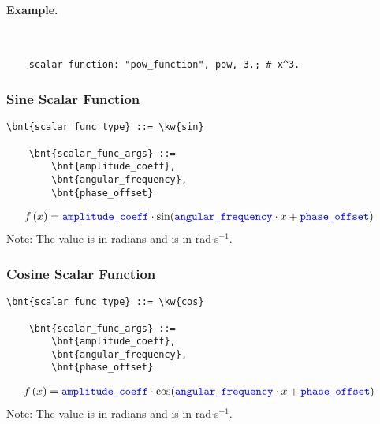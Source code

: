 \paragraph{Example.} \
\begin{verbatim}
    scalar function: "pow_function", pow, 3.; # x^3.
\end{verbatim}

\subsubsection{Sine Scalar Function}
\begin{Verbatim}[commandchars=\\\{\}]
    \bnt{scalar_func_type} ::= \kw{sin}

    \bnt{scalar_func_args} ::=
        \bnt{amplitude_coeff},
        \bnt{angular_frequency},
        \bnt{phase_offset}
\end{Verbatim}
\begin{align}
        f\plbr{x}
        &=
        \nt{amplitude\_coeff} \cdot \sin(\nt{angular\_frequency} \cdot x + )
\end{align}
Note: The value \nt{phase\_offset} is in radians and  is in rad$\cdot$s$^{-1}$.

\subsubsection{Cosine Scalar Function}
\begin{Verbatim}[commandchars=\\\{\}]
    \bnt{scalar_func_type} ::= \kw{cos}

    \bnt{scalar_func_args} ::=
        \bnt{amplitude_coeff},
        \bnt{angular_frequency},
        \bnt{phase_offset}

\end{Verbatim}
\begin{align}
        f\plbr{x}
        &=
        \nt{amplitude\_coeff} \cdot \cos(\nt{angular\_frequency} \cdot x + )
\end{align}
Note: The value \nt{phase\_offset} is in radians and  is in rad$\cdot$s$^{-1}$.

